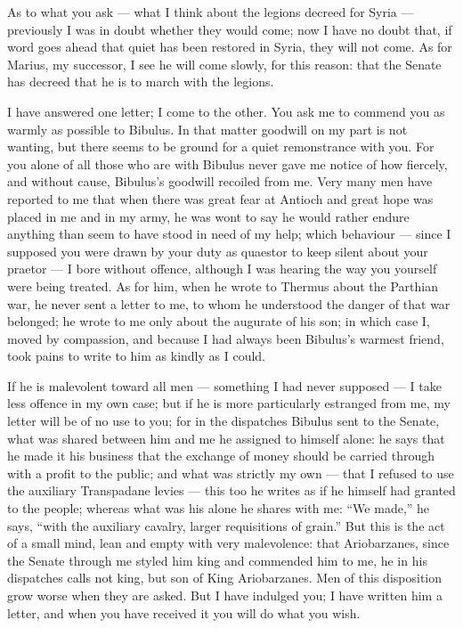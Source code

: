 As to what you ask --- what I think about the legions decreed for Syria --- previously I was in doubt whether they would come; now I have no doubt that, if word goes ahead that quiet has been restored in Syria, they will not come. As for Marius, my successor, I see he will come slowly, for this reason: that the Senate has decreed that he is to march with the legions.

 I have answered one letter; I come to the other. You ask me to commend you as warmly as possible to Bibulus. In that matter goodwill on my part is not wanting, but there seems to be ground for a quiet remonstrance with you. For you alone of all those who are with Bibulus never gave me notice of how fiercely, and without cause, Bibulus's goodwill recoiled from me. Very many men have reported to me that when there was great fear at Antioch and great hope was placed in me and in my army, he was wont to say he would rather endure anything than seem to have stood in need of my help; which behaviour --- since I supposed you were drawn by your duty as quaestor to keep silent about your praetor --- I bore without offence, although I was hearing the way you yourself were being treated. As for him, when he wrote to Thermus about the Parthian war, he never sent a letter to me, to whom he understood the danger of that war belonged; he wrote to me only about the augurate of his son; in which case I, moved by compassion, and because I had always been Bibulus's warmest friend, took pains to write to him as kindly as I could.

 If he is malevolent toward all men --- something I had never supposed --- I take less offence in my own case; but if he is more particularly estranged from me, my letter will be of no use to you; for in the dispatches Bibulus sent to the Senate, what was shared between him and me he assigned to himself alone: he says that he made it his business that the exchange of money should be carried through with a profit to the public; and what was strictly my own --- that I refused to use the auxiliary Transpadane levies --- this too he writes as if he himself had granted to the people; whereas what was his alone he shares with me: ``We made,'' he says, ``with the auxiliary cavalry, larger requisitions of grain.'' But this is the act of a small mind, lean and empty with very malevolence: that Ariobarzanes, since the Senate through me styled him king and commended him to me, he in his dispatches calls not king, but son of King Ariobarzanes. Men of this disposition grow worse when they are asked. But I have indulged you; I have written him a letter, and when you have received it you will do what you wish.
